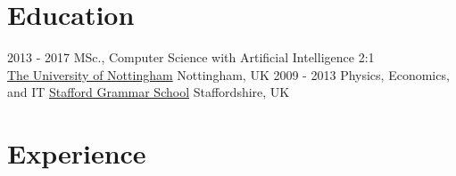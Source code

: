 \documentclass[a4paper]{twentysecondcv} %
\begin{document}
\makeprofile %

\section{Education}

\begin{twenty} %
	\twentyitem
    	{2013 - 2017}
        {}
        {MSc., Computer Science with Artificial Intelligence \textnormal{2:1}\\}
        {\href{https://www.nottingham.ac.uk//}{The University of Nottingham}}
        {Nottingham, UK}
        {}
	\twentyitem
    	{2009 - 2013}
		{}
        {Physics, Economics, and IT}
        {\href{http://www.staffordgrammar.co.uk/}{Stafford Grammar School}}
        {Staffordshire, UK}
        {}
\end{twenty}


\section{Experience}
\end{document}
